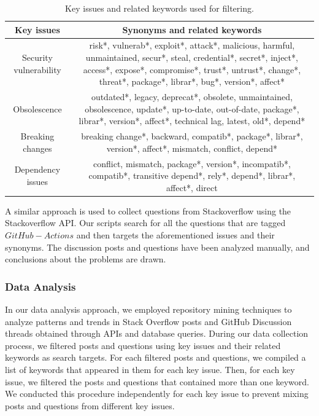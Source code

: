 \documentclass[conference]{IEEEtran}
\begin{document}
    \begin{table}[H]
            \centering
            \caption{Key issues and related keywords used for filtering.}
            \label{tab:related_keywords}
	        \hspace{5cm}
            \begin{tabular}{|c|c|}
              \hline
              \textbf{Key issues} & \textbf{Synonyms and related keywords} \\
              \hline
              Security vulnerability & \parbox[t]{5.5cm}{risk*, vulnerab*, exploit*, attack*, malicious, harmful, unmaintained, secur*, steal, credential*, secret*, inject*, access*, expose*, compromise*, trust*, untrust*, change*, threat*, package*, librar*, bug*,  version*, affect*\\}  \\
             \hline
             Obsolescence & \parbox[t]{5.5cm}{outdated*, legacy, deprecat*, obsolete, unmaintained, obsolescence, update*, up-to-date, out-of-date, package*, librar*, version*, affect*, technical lag, latest, old*, depend*\\}  \\
              \hline
              Breaking changes & \parbox[t]{5.5cm}{breaking change*,  backward, compatib*, package*, librar*, version*, affect*, mismatch, conflict, depend*\\} \\
              \hline
              Dependency issues &  \parbox[t]{5.5cm}{conflict, mismatch, package*, version*, incompatib*, compatib*, transitive depend*, rely*, depend*, librar*, affect*, direct\\}  \\
              \hline
          \end{tabular}
    \end{table}
                A similar approach is used to collect questions from Stackoverflow using the Stackoverflow API. Our scripts search for all the questions that are tagged $GitHub-Actions$ and then targets the aforementioned issues and their synonyms. The discussion posts and questions have been analyzed manually, and conclusions about the problems are drawn.\\

            \subsubsection{\textbf{Data Analysis}}
                In our data analysis approach, we employed repository mining techniques to analyze patterns and trends in Stack Overflow posts and GitHub Discussion threads obtained through APIs and database queries. During our data collection process, we filtered posts and questions using key issues and their related keywords as search targets. For each filtered posts and questions, we compiled a list of keywords that appeared in them for each key issue. Then, for each key issue, we filtered the posts and questions that contained more than one keyword. We conducted this procedure independently for each key issue to prevent mixing posts and questions from different key issues.
\end{document}
